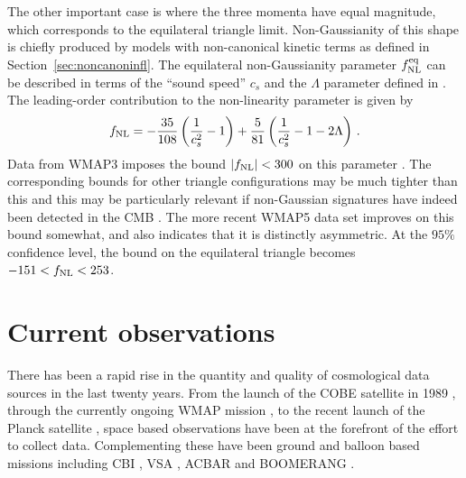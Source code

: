 The other important case is   
where the three momenta have equal magnitude, which corresponds to the
equilateral triangle limit. Non-Gaussianity of this shape is chiefly produced
by models with non-canonical kinetic terms as defined in
Section~\ref{sec:noncanoninfl}. The equilateral non-Gaussianity parameter
$f_{\mathrm{NL}}^{\mathrm{eq}}$ can be described in terms of the ``sound speed'' $c_s$ and the
$\Lambda$ parameter defined in .
The leading-order contribution to the
non-linearity 
parameter is given by \cite{chenetal,lidser3}
% 
\begin{equation} 
\label{eq:fnldefn-dbiintro}
 f_{\mathrm{NL}} = -\frac{35}{108}\left(\frac{1}{c_s^2} -1 \right) +
\frac{5}{81}\left( \frac{1}{c_s^2} -1 -2\Lambda \right) \,.
\end{equation}
%  
Data from WMAP3 imposes the bound $|f_{\mathrm{NL}}| < 300$ on this parameter
\cite{spergel}. The corresponding bounds for other triangle configurations 
may be much tighter than this and this may be particularly relevant if 
non-Gaussian signatures have indeed been detected in the 
CMB \cite{Yadav:2007yy,crim}. The more recent WMAP5 data set
\cite{Komatsu:2008hk} improves on this bound somewhat, and
also indicates that it is distinctly asymmetric. At the $95 \%$ confidence
level, the bound on the 
equilateral triangle becomes $-151 < f_{\mathrm{NL}} < 253$.





\section{Current observations}
\label{sec:obs-intro}
There has been a rapid rise in the quantity and quality of cosmological data
sources in the last twenty years. From the launch of the COBE satellite in
1989 \cite{Bennett1994, Bennett1996c}, through the currently
ongoing WMAP mission \cite{spergel, Komatsu:2008hk}, to the recent launch of the
Planck satellite \cite{planck}, space based observations have been at the
forefront of the effort to collect data. Complementing these have been ground
and balloon based missions including CBI
\cite{Mason2003b, Sievers2003, Sievers2007}, VSA \cite{Dickinson2004}, ACBAR
\cite{Kuo2004, Kuo2007} and BOOMERANG \cite{Ruhl2003, Montroy2006,
Piacentini2006}.

